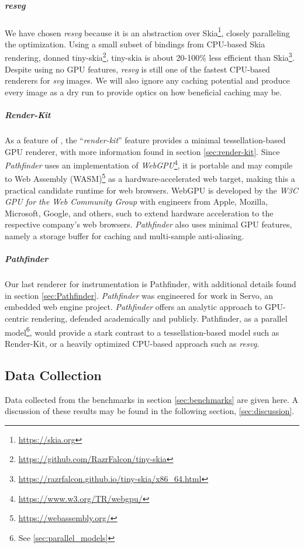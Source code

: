 \subparagraph{resvg} We have chosen \textit{resvg} because it is an abstraction over Skia\footnote{\href{https://skia.org}{https://skia.org}}, closely paralleling the optimization. Using a small subset of bindings from CPU-based Skia rendering, donned tiny-skia\footnote{\href{https://github.com/RazrFalcon/tiny-skia}{https://github.com/RazrFalcon/tiny-skia}}, tiny-skia is about 20-100\% less efficient than Skia\footnote{\href{https://razrfalcon.github.io/tiny-skia/x86_64.html}{https://razrfalcon.github.io/tiny-skia/x86\_64.html}}. Despite using no GPU features, \textit{resvg} is still one of the fastest CPU-based renderers for \textit{svg} images. We will also ignore any caching potential and produce every image as a dry run to provide optics on how beneficial caching may be.

\subparagraph{Render-Kit} As a feature of \toollinkedname, the ``\textit{render-kit}'' feature provides a minimal tessellation-based GPU renderer, with more information found in section \cref{sec:render-kit}. Since \textit{Pathfinder} uses an implementation of \textit{WebGPU}\footnote{\href{https://www.w3.org/TR/webgpu/}{https://www.w3.org/TR/webgpu/}}, it is portable and may compile to Web Assembly (WASM)\footnote{\href{https://webassembly.org/}{https://webassembly.org/}} as a hardware-accelerated web target, making this a practical candidate runtime for web browsers. WebGPU is developed by the \textit{W3C GPU for the Web Community Group} with engineers from Apple, Mozilla, Microsoft, Google, and others\cite{WebGPU}, such to extend hardware acceleration to the respective company's web browsers. \textit{Pathfinder} also uses minimal GPU features, namely a storage buffer for caching and multi-sample anti-aliasing.

\subparagraph{Pathfinder} Our last renderer for instrumentation is Pathfinder, with additional details found in section \cref{sec:Pathfinder}. \textit{Pathfinder} was engineered for work in Servo, an embedded web engine project. \textit{Pathfinder} offers an analytic approach to GPU-centric rendering, defended academically and publicly\cite{Walton18}. Pathfinder, as a parallel model\footnote{See \cref{sec:parallel_models}}, would provide a stark contrast to a tessellation-based model such as Render-Kit, or a heavily optimized CPU-based approach such as \textit{resvg}.

\subsection{Data Collection}
Data collected from the benchmarks in section \cref{sec:benchmarks} are given here. A discussion of these results may be found in the following section, \cref{sec:discussion}.

